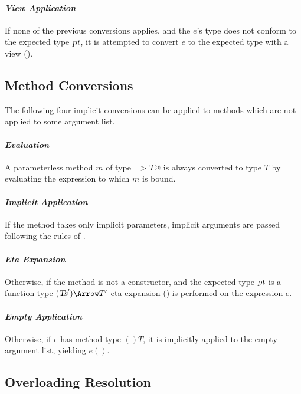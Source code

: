 \paragraph{\em View Application}
If none of the previous conversions applies, and the $e$'s type
does not conform to the expected type $\mbox{\sl pt}$, it is attempted to convert
$e$ to the expected type with a view ().\bigskip

\subsection{Method Conversions}

The following four implicit conversions can be applied to methods
which are not applied to some argument list.

\paragraph{\em Evaluation}
A parameterless method $m$ of type \lstinline@=> $T$@ is always converted to
type $T$ by evaluating the expression to which $m$ is bound.

\paragraph{\em Implicit Application}
  If the method takes only implicit parameters, implicit
  arguments are passed following the rules of .

\paragraph{\em Eta Expansion}
  Otherwise, if the method is not a constructor, 
  and the expected type $\mbox{\sl pt}$ is a function type
  $(\Ts') \Arrow T'$ eta-expansion
  () is performed on the
  expression $e$.

\paragraph{\em Empty Application}
  Otherwise, if $e$ has method type $()T$, it is implicitly applied to the empty
  argument list, yielding $e()$.

\subsection{Overloading Resolution}
\label{sec:overloading-resolution}

